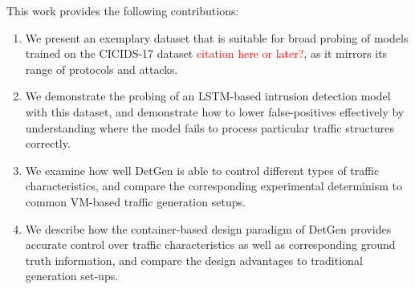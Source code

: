 \documentclass[runningheads]{llncs}
\begin{document}

 
This work provides the following contributions:

\begin{enumerate}
\item We present an exemplary dataset that is suitable for broad probing of models trained on the CICIDS-17 dataset \textcolor{red}{citation here or later?}, as it mirrors its range of protocols and attacks.

\item We demonstrate the probing of an LSTM-based intrusion detection model with this dataset, and demonstrate how to lower false-positives effectively by understanding where the model fails to process particular traffic structures correctly.

\item We examine how well DetGen is able to control different types of traffic characteristics, and compare the corresponding experimental determinism to common VM-based traffic generation setups.

\item We describe how the container-based design paradigm of DetGen provides accurate control over traffic characteristics as well as corresponding ground truth information, and compare the design advantages to traditional generation set-ups.





\end{enumerate}
\end{document}
